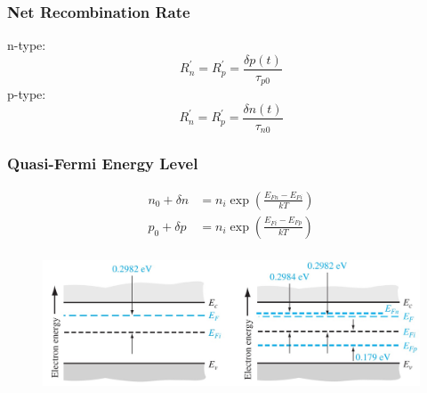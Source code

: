\documentclass{beamer}
\begin{document}
    \begin{frame} \frametitle{Net Recombination Rate}
        n-type:
        \begin{equation*}
            R^\prime_n = R^\prime_p = \frac{\delta p(t)}{\tau_{p0}}
        \end{equation*}
        p-type:
        \begin{equation*}
            R^\prime_n = R^\prime_p = \frac{\delta n(t)}{\tau_{n0}} 
        \end{equation*}
    \end{frame}

    \begin{frame} \frametitle{Quasi-Fermi Energy Level}
        \begin{equation*}
            \begin{aligned}
                n_0 + \delta n &= n_i \exp \left( \frac{E_{Fn} - E_{Fi}}{kT}  \right) \\
                p_0 + \delta p &= n_i \exp \left( \frac{E_{Fi} - E_{Fp}}{kT}  \right) \\
            \end{aligned}
        \end{equation*}
        \begin{figure}[H]
            \centering
            \includegraphics[width=\linewidth]{Quasi-fermi-level-C5.jpg}
            \label{fig:Quasi-fermi-level-C5.jpg}
        \end{figure}
    \end{frame}

\end{document}
